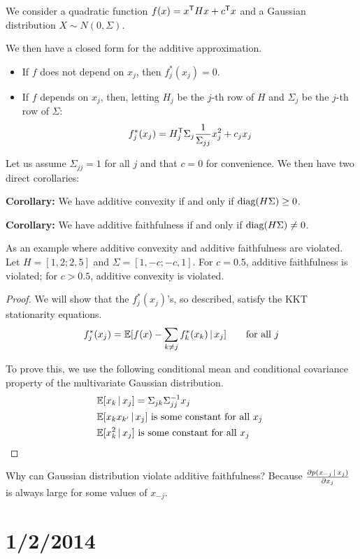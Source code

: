 \documentclass{article}
\begin{document}
{We consider a quadratic function $f(x) = x^{\mathsf{T}} H x + c^{\mathsf{T}} x$ and a Gaussian distribution $X \sim N(0, \Sigma)$. 

We then have a closed form for the additive approximation.
\begin{itemize}
\item If $f$ does not depend on $x_j$, then $f^*_j(x_j) = 0$.
\item If $f$ depends on $x_j$, then, letting $H_j$ be the $j$-th row of $H$ and $\Sigma_j$ be the $j$-th row of $\Sigma$:
\[
f^*_j(x_j) = H_j^{\mathsf{T}} \Sigma_j \frac{1}{\Sigma_{jj}} x_j^2 + c_j x_j
\]

\end{itemize}

Let us assume $\Sigma_{jj} = 1$ for all $j$ and that $c=0$ for convenience. We then have two direct corollaries:

\textbf{Corollary:} We have additive convexity if and only if $\textrm{diag}(H \Sigma) \geq 0$.

\textbf{Corollary:} We have additive faithfulness if and only if $\textrm{diag}(H \Sigma) \neq 0$.

As an example where additive convexity and additive faithfulness are violated. Let $H = [1, 2; 2, 5]$ and $\Sigma = [1, -c; -c, 1]$. For $c=0.5$, additive faithfulness is violated; for $c > 0.5$, additive convexity is violated.


\begin{proof}
We will show that the $f^*_j(x_j)$'s, so described, satisfy the KKT stationarity equations.
\[
f^*_j(x_j) = \mathbb{E}[ f(x) - \sum_{k \neq j} f^*_k(x_k) \,|\, x_j ]  \qquad \textrm{for all } j
\]

To prove this, we use the following conditional mean and conditional covariance property of the multivariate Gaussian distribution.
\begin{align*}
& \mathbb{E}[ x_k \,|\, x_j ] = \Sigma_{jk} \Sigma_{jj}^{-1} x_j \\
& \mathbb{E}[ x_k x_{k'} \,|\, x_j] \textrm{ is some constant for all $x_j$ } \\
& \mathbb{E}[ x_k^2 \,|\, x_j ] \textrm{ is some constant for all $x_j$ } 
\end{align*}
\end{proof}

Why can Gaussian distribution violate additive faithfulness? Because $\frac{\partial p( x_{-j} \,|\, x_j) }{\partial x_j}$ is always large for some values of $x_{-j}$.

\newpage

\section{1/2/2014}

}
\end{document}
